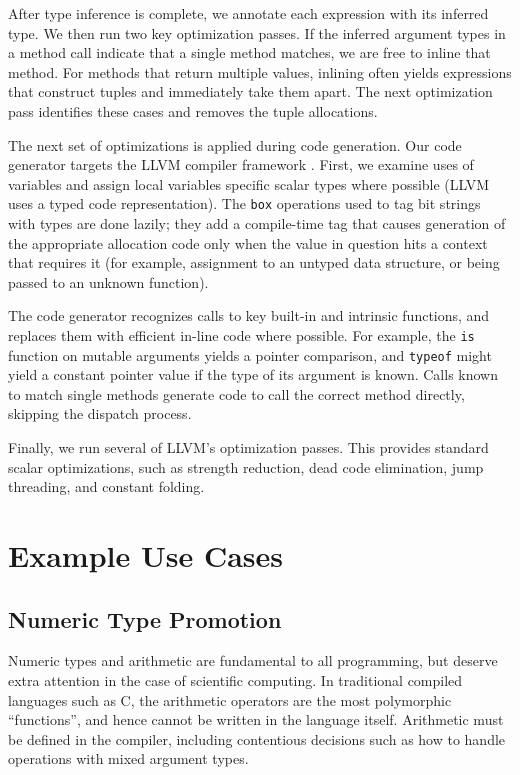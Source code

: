 \documentclass[9pt]{sigplanconf}
\begin{document}
After type inference is complete, we annotate each expression with its
inferred type. We then run two key optimization passes.
If the inferred argument types in a method call
indicate that a single method matches, we are free to inline that method.
For methods that return multiple values, inlining often yields
expressions that construct tuples and immediately take them apart. The
next optimization pass identifies these cases and removes the tuple
allocations.

The next set of optimizations is applied during code generation.
Our code generator targets the LLVM compiler framework \cite{LLVM}.
First, we examine uses of variables and assign local variables specific
scalar types where possible (LLVM uses a typed code representation).
The {\tt box} operations used to tag bit strings with types are done
lazily; they add a compile-time tag that causes generation of the
appropriate allocation code only when the value in question hits a context
that requires it (for example, assignment to an untyped data structure,
or being passed to an unknown function).

The code generator recognizes calls to key built-in and intrinsic functions,
and replaces them with efficient in-line code where possible. For example,
the {\tt is} function on mutable arguments yields a pointer comparison, and
{\tt typeof} might
yield a constant pointer value if the type of its argument is known.
Calls known to match single methods generate code to call the correct
method directly, skipping the dispatch process.

Finally, we run several of LLVM's optimization passes.
This provides standard scalar optimizations, such as
strength reduction, dead code elimination, jump threading, and constant
folding.


\section{Example Use Cases}

\subsection{Numeric Type Promotion}

Numeric types and arithmetic are fundamental to all programming, but deserve
extra attention in the case of scientific computing.
In traditional compiled languages such as C, the arithmetic operators are the
most polymorphic ``functions'', and hence cannot be written in the language
itself. Arithmetic must be defined in the compiler, including contentious
decisions such as how to handle operations with mixed argument types.
\end{document}
